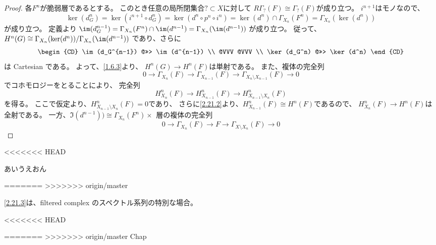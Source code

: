 \documentclass[uplatex,dvipdfmx]{jsarticle}
\begin{document}
\begin{proof}
  各\(F^n\)が脆弱層であるとする。
  このとき任意の局所閉集合\(?\subset X\)に対して
  \(R\Gamma_{?}(F)\cong \Gamma_{?}(F)\)が成り立つ。
  \(i^{n+1}\)はモノなので、
  \[
  \ker(d_G^n) = \ker(i^{n+1}\circ d_G^n) = \ker(d^n\circ p^n \circ i^n)
  = \ker(d^n)\cap \Gamma_{X_n}(F^n) = \Gamma_{X_n}(\ker(d^n))
  \]
  が成り立つ。
  定義より
  \(\im(d_G^{n-1}) = \Gamma_{X_n}(F^n)\cap \im(d^{n-1}) = \Gamma_{X_n}(\im(d^{n-1}))\)
  が成り立つ。
  従って、
  \(H^n(G) \cong \Gamma_{X_n}(\ker(d^n))/\Gamma_{X_n}(\im(d^{n-1}))\)
  であり、さらに
  \[
  \begin{CD}
    \im(d_G^{n-1}) @>>> \im(d^{n-1}) \\
    @VVV @VVV \\
    \ker(d_G^n) @>>> \ker(d^n)
  \end{CD}
  \]
  は Cartesian である。
  よって、\autoref{1.6.3}より、
  \(H^n(G) \to H^n(F)\)は単射である。
  また、複体の完全列
  \[
  0\to \Gamma_{X_n}(F) \to \Gamma_{X_{n-1}}(F) \to
  \Gamma_{X_n\setminus X_{n-1}}(F) \to 0
  \]
  でコホモロジーをとることにより、
  完全列
  \[
  H^n_{X_n}(F) \to H^n_{X_{n-1}}(F) \to H^n_{X_{n-1}\setminus X_n}(F)
  \]
  を得る。
  ここで仮定より、\(H^n_{X_{n-1}\setminus X_n}(F) = 0\)であり、
  さらに\ref{2.21.2}より、\(H^n_{X_{n-1}}(F)\cong H^n(F)\)であるので、
  \(H^n_{X_n}(F) \to H^n(F)\)は全射である。
  一方、\(\Im(d^{n-1})) \cong \Gamma_{X_n}(F^n)\times_{} \)
  層の複体の完全列
  \[
  0 \to \Gamma_{X_n}(F) \to F\to \Gamma_{X\setminus X_n}(F) \to 0
  \]

\end{proof}

<<<<<<< HEAD

あいうえおん

=======
>>>>>>> origin/master
\begin{kansou*}
  \ref{2.21.3}は、filtered complex のスペクトル系列の特別な場合。
\end{kansou*}


<<<<<<< HEAD

=======
>>>>>>> origin/master
\ifcsname Chap\endcsname\else
\printbibliography
\end{document}
